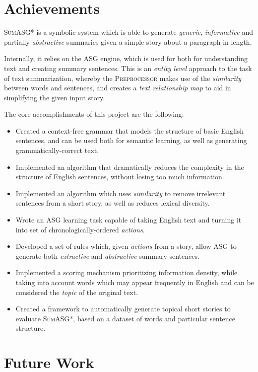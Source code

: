 \section{Achievements}

\textsc{SumASG*} is a symbolic system which is able to generate \textit{generic}, \textit{informative} and partially-\textit{abstractive} summaries given a simple story about a paragraph in length.

Internally, it relies on the ASG engine, which is used for both for understanding text and creating summary sentences. This is an \textit{entity level} approach to the task of text summarization, whereby the \textsc{Preprocessor} makes use of the \textit{similarity} between words and sentences, and creates a \textit{text relationship map} to aid in simplifying the given input story.

The core accomplishments of this project are the following:

\begin{itemize}
\item Created a context-free grammar that models the structure of basic English sentences, and can be used both for semantic learning, as well as generating grammatically-correct text.
\item Implemented an algorithm that dramatically reduces the complexity in the structure of English sentences, without losing too much information.
\item Implemented an algorithm which uses \textit{similarity} to remove irrelevant sentences from a short story, as well as reduces lexical diversity.
\item Wrote an ASG learning task capable of taking English text and turning it into set of chronologically-ordered \textit{actions}.
\item Developed a set of rules which, given \textit{actions} from a story, allow ASG to generate both \textit{extractive} and \textit{abstractive} summary sentences.
\item Implemented a scoring mechanism prioritizing information density, while taking into account words which may appear frequently in English and can be considered the \textit{topic} of the original text.
\item Created a framework to automatically generate topical short stories to evaluate \textsc{SumASG*}, based on a dataset of words and particular sentence structure.
\end{itemize}

\section{Future Work}

